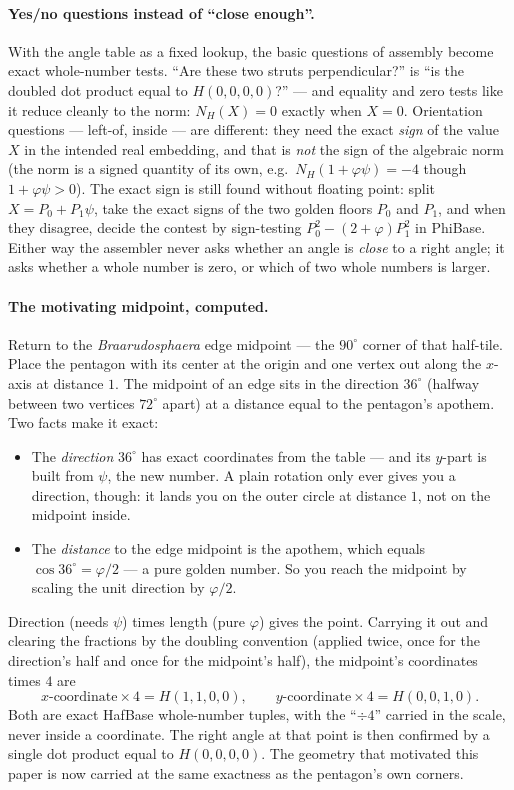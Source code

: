 \documentclass[11pt]{article}
\newcommand{\phigr}{\varphi}
\newcommand{\Hn}[4]{H(#1,#2,#3,#4)}
\begin{document}
\paragraph{Yes/no questions instead of ``close enough''.} With the angle table as a fixed lookup,
the basic questions of assembly become exact whole-number tests. ``Are these two struts
perpendicular?'' is ``is the doubled dot product equal to $\Hn{0}{0}{0}{0}$?'' --- and equality and
zero tests like it reduce cleanly to the norm: $N_H(X) = 0$ exactly when $X = 0$. Orientation questions
--- left-of, inside --- are different: they need the exact \emph{sign} of the value $X$ in the intended
real embedding, and that is \emph{not} the sign of the algebraic norm (the norm is a signed quantity of
its own, e.g.\ $N_H(1 + \phigr\psi) = -4$ though $1 + \phigr\psi > 0$). The exact sign is still found
without floating point: split $X = P_0 + P_1\psi$, take the exact signs of the two golden floors $P_0$
and $P_1$, and when they disagree, decide the contest by sign-testing $P_0^2 - (2+\phigr)P_1^2$ in
PhiBase. Either way the assembler never asks whether an angle is \emph{close} to a right angle; it asks
whether a whole number is zero, or which of two whole numbers is larger.

\paragraph{The motivating midpoint, computed.} Return to the \emph{Braarudosphaera} edge midpoint ---
the $90^\circ$ corner of that half-tile. Place the pentagon with its center at the origin and one
vertex out along the $x$-axis at distance $1$. The midpoint of an edge sits in the direction
$36^\circ$ (halfway between two vertices $72^\circ$ apart) at a distance equal to the pentagon's
apothem. Two facts make it exact:
\begin{itemize}
\item The \emph{direction} $36^\circ$ has exact coordinates from the table --- and its $y$-part is
built from $\psi$, the new number. A plain rotation only ever gives you a direction, though: it lands
you on the outer circle at distance $1$, not on the midpoint inside.
\item The \emph{distance} to the edge midpoint is the apothem, which equals $\cos 36^\circ = \phigr/2$
--- a pure golden number. So you reach the midpoint by scaling the unit direction by $\phigr/2$.
\end{itemize}
Direction (needs $\psi$) times length (pure $\phigr$) gives the point. Carrying it out and clearing
the fractions by the doubling convention (applied twice, once for the direction's half and once for
the midpoint's half), the midpoint's coordinates times $4$ are
\[
x\text{-coordinate}\times 4 = \Hn{1}{1}{0}{0}, \qquad y\text{-coordinate}\times 4 = \Hn{0}{0}{1}{0}.
\]
Both are exact HafBase whole-number tuples, with the ``$\div 4$'' carried in the scale, never inside
a coordinate. The right angle at that point is then confirmed by a single dot product equal to
$\Hn{0}{0}{0}{0}$. The geometry that motivated this paper is now carried at the same exactness as the
pentagon's own corners.
\end{document}
